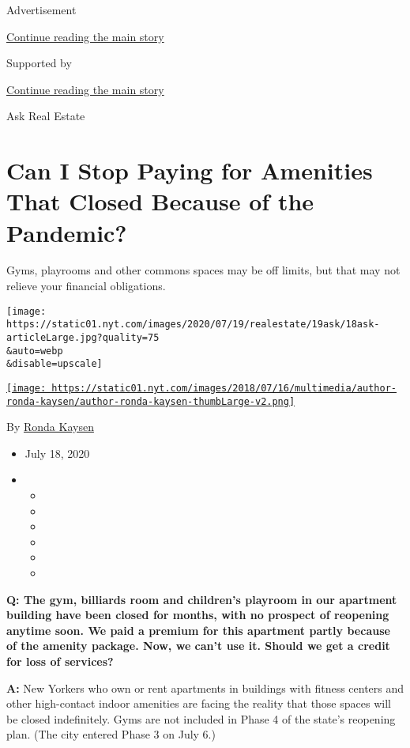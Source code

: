 Advertisement

\protect\hyperlink{after-top}{Continue reading the main story}

Supported by

\protect\hyperlink{after-sponsor}{Continue reading the main story}

Ask Real Estate

\hypertarget{can-i-stop-paying-for-amenities-that-closed-because-of-the-pandemic}{%
\section{Can I Stop Paying for Amenities That Closed Because of the
Pandemic?}\label{can-i-stop-paying-for-amenities-that-closed-because-of-the-pandemic}}

Gyms, playrooms and other commons spaces may be off limits, but that may
not relieve your financial obligations.

\texttt{[image: https://static01.nyt.com/images/2020/07/19/realestate/19ask/18ask-articleLarge.jpg?quality=75\\\&auto=webp\\\&disable=upscale]}

\href{https://www.nytimes.com/by/ronda-kaysen}{\texttt{[image: https://static01.nyt.com/images/2018/07/16/multimedia/author-ronda-kaysen/author-ronda-kaysen-thumbLarge-v2.png]}}

By \href{https://www.nytimes.com/by/ronda-kaysen}{Ronda Kaysen}

\begin{itemize}
\item
  July 18, 2020
\item
  \begin{itemize}
  \item
  \item
  \item
  \item
  \item
  \item
  \end{itemize}
\end{itemize}

\textbf{Q: The gym, billiards room and children's playroom in our
apartment building have been closed for months, with no prospect of
reopening anytime soon. We paid a premium for this apartment partly
because of the amenity package. Now, we can't use it. Should we get a
credit for loss of services?}

\textbf{A:} New Yorkers who own or rent apartments in buildings with
fitness centers and other high-contact indoor amenities are facing the
reality that those spaces will be closed indefinitely. Gyms are not
included in Phase 4 of the state's reopening plan. (The city entered
Phase 3 on July 6.)

